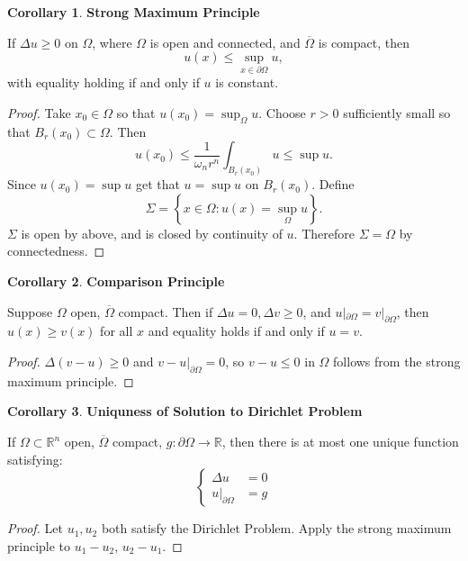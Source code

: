 \documentclass[12pt, a4paper]{article}
\theoremstyle{definition}
\newtheorem{cor}{Corollary}
\newcommand{\R}{\mathbb{R}}                           %
\newcommand{\bd}{\partial}
\newcommand{\ol}{\overline}
\begin{document}
\begin{tcolorbox}
\begin{cor}
	\textbf{Strong Maximum Principle}
\end{cor}
	If $\Delta u \geq 0$ on $\Omega$, where $\Omega$ is open and connected, and $\ol{\Omega}$ is compact,  then 
	$$ u(x) \leq \sup_{x\in \bd \Omega} u, $$ 
	with equality holding if and only if $u$ is constant. 
	\begin{proof}
		Take $x_0 \in \Omega$ so that $u(x_0) = \sup_\Omega u$. Choose $r>0$ sufficiently small so that $B_r(x_0) \subset \Omega$. Then
		$$ u(x_0) \leq \frac{ 1 }{ \omega_n r^n }\int_{B_r(x_0)} u \leq \sup u. $$ 
Since $u(x_0) = \sup u$ get that $u = \sup u$ on $B_r(x_0)$. Define
		$$ \Sigma = \left\{ x\in \Omega : u(x) = \sup_\Omega u \right\} .$$ 
		$\Sigma $ is open by above, and is closed by continuity of $u$. Therefore $\Sigma = \Omega$ by connectedness. 
	\end{proof}
\end{tcolorbox}
\begin{tcolorbox}
\begin{cor}
	\textbf{Comparison Principle}
\end{cor}
	Suppose $\Omega$ open, $\ol{\Omega}$ compact. Then if $\Delta u = 0, \Delta v \geq 0$, and 
$u|_{\bd \Omega} = v|_{\bd \Omega}$, then $u(x) \geq v(x)$ for all $x$ and equality holds if and only if $u = v$. 
\begin{proof}
	$\Delta (v-u) \geq 0$ and $v-u|_{\bd \Omega} = 0$, so $v-u \leq 0$ in $\Omega$ follows from the strong maximum principle. 
\end{proof}
\end{tcolorbox}
\begin{tcolorbox}
\begin{cor}
	\textbf{Uniquness of Solution to Dirichlet Problem}
\end{cor}
	If $\Omega \subset \R^n$ open, $\ol{\Omega}$ compact, $g: \bd \Omega \to \R$, then there is at most one unique function satisfying:
	$$ \begin{cases}
		\Delta u & = 0
		\\ u|_{\bd \Omega} & = g
	\end{cases} $$ 
\begin{proof}
Let $u_1, u_2$ both satisfy the Dirichlet Problem. Apply the strong maximum principle to $u_1-u_2$, 
$u_2-u_1$. 
\end{proof}
\end{tcolorbox}
\end{document}
